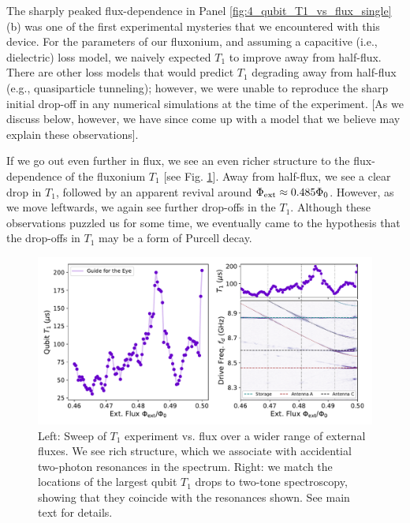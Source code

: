 The sharply peaked flux-dependence in Panel \ref{fig:4_qubit_T1_vs_flux_single}(b) was one of the first experimental mysteries that we encountered with this device. For the parameters of our fluxonium, and assuming a capacitive (i.e., dielectric) loss model, we naively expected $T_1$ to improve away from half-flux. There are other loss models that would predict $T_1$ degrading away from half-flux (e.g., quasiparticle tunneling); however, we were unable to reproduce the sharp initial drop-off in any numerical simulations at the time of the experiment. [As we discuss below, however, we have since come up with a model that we believe may explain these observations]. 

If we go out even further in flux, we see an even richer structure to the flux-dependence of the fluxonium $T_1$ [see Fig. \ref{fig:4_qubit_T1_vs_flux_spec}]. Away from half-flux, we see a clear drop in $T_1$, followed by an apparent revival around $\Phi_{\rm ext} \approx 0.485\Phi_0$. However, as we move leftwards, we again see further drop-offs in the $T_1$. Although these observations puzzled us for some time, we eventually came to the hypothesis that the drop-offs in $T_1$ may be a form of Purcell decay.

\begin{figure}[h]
    \centering
    \includegraphics[width=0.95\linewidth]{Figures/4/qubit_T1_vs_flux_spec.pdf}
    \caption[Wider range sweep of qubit \texorpdfstring{$T_1$}{T1} vs. flux.]{Left: Sweep of $T_1$ experiment vs. flux over a wider range of external fluxes. We see rich structure, which we associate with accidential two-photon resonances in the spectrum. Right: we match the locations of the largest qubit $T_1$ drops to two-tone spectroscopy, showing that they coincide with the resonances shown. See main text for details.}
    \label{fig:4_qubit_T1_vs_flux_spec}
\end{figure}

